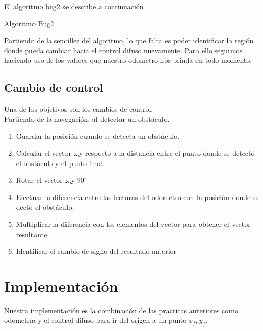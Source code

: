\documentclass[oneside,onecolumn]{article}
\begin{document}
El algoritmo bug2 se describe a continuación


\begin{algorithm}
  \caption{Algoritmo Bug2}\label{alg:two}
\end{algorithm}

Partiendo de la sencillez del algoritmo, lo que falta es poder identificar la región donde pueda cambiar hacia el control difuso nuevamente. Para ello seguimos haciendo uso de los valores que nuestro odometro nos brinda en todo momento.

\subsection{Cambio de control}

Una de los objetivos son los cambios de control.\\

Partiendo de la navegación, al detectar un obstáculo.

\begin{enumerate}
\item Guardar la posición cuando se detecta un obstáculo.
\item Calcular el vector x,y respecto a la distancia entre el punto donde se detectó el obstáculo y el punto final.
\item Rotar el vector x,y $90^{\circ}$
\item Efectuar la diferencia entre las lecturas del odometro con la posición donde se dectó el obstáculo.
\item Multiplicar la diferencia con los elementos del vector para obtener el vector resultante
\item Identificar el cambio de signo del resultado anterior
\end{enumerate}


\section{Implementación}

Nuestra implementación es la combinación de las practicas anteriores como odometría y el control difuso para ir del origen a un punto $x_f,y_f$.\\
\end{document}

